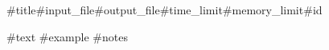 \begin{problem}{#{title}}{#{input_file}}{#{output_file}}{#{time_limit}}{#{memory_limit}}{#{id}}
\graphicspath{{../#{path}/statements/}}
#{text}
#{example}
#{notes}
\end{problem}
